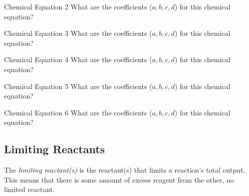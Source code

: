 \begin{example}[]{Chemical Equation 2}
  What are the coefficients ($a, b, c, d$) for this chemical equation? \\
  
  \tcblower
  
\end{example}

\begin{example}[]{Chemical Equation 3}
  What are the coefficients ($a, b, c, d$) for this chemical equation? \\
  
  \tcblower
  
\end{example}

\begin{example}[]{Chemical Equation 4}
  What are the coefficients ($a, b, c, d$) for this chemical equation? \\
  
  \tcblower
  
\end{example}

\begin{example}[]{Chemical Equation 5}
  What are the coefficients ($a, b, c, d$) for this chemical equation? \\
  
  \tcblower
  
\end{example}

\begin{example}[]{Chemical Equation 6}
  What are the coefficients ($a, b, c, d$) for this chemical equation? \\
  
  \tcblower
  
\end{example}

\subsection{Limiting Reactants} \label{subsec:Limiting Reactants}
\begin{definition} \label{def:Limiting Reactants}
  The \emph{limiting reactant(s)} is the reactant(s) that limits a reaction's total output.
  This means that there is some amount of excess reagent from the other, no limited reactant.
\end{definition}

